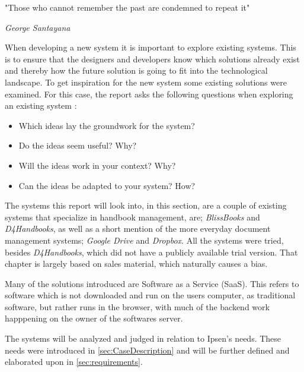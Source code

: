\epigraph{"Those who cannot remember the past are condemned to repeat it"}{\textit{George Santayana}}
When developing a new system it is important to explore existing systems.
This is to ensure that the designers and developers know which solutions already exist and thereby how the future solution is going to fit into the technological landscape.
To get inspiration for the new system some existing solutions were examined.
For this case, the report asks the following questions when exploring an existing system \citep[p.~33]{Rod-Aalborg}:

\begin{itemize}
  \item Which ideas lay the groundwork for the system?
  \item Do the ideas seem useful? Why?
  \item Will the ideas work in your context? Why?
  \item Can the ideas be adapted to your system? How?
\end{itemize}

The systems this report will look into, in this section, are a couple of existing systems that specialize in handbook management, are; \textit{BlissBooks} and \textit{D4Handbooks}, as well as a short mention of the more everyday document management systems; \textit{Google Drive} and \textit{Dropbox}.
All the systems were tried, besides \textit{D4Handbooks}, which did not have a publicly available trial version. That chapter is largely based on sales material, which naturally causes a bias.

Many of the solutions introduced are Software as a Service (SaaS).
This refers to software which is not downloaded and run on the users computer, as traditional software, but rather runs in the browser, with much of the backend work happpening on the owner of the softwares server. %

The systems will be analyzed and judged in relation to Ipsen's needs.
These needs were introduced in \ref{sec:CaseDescription} and will be further defined and elaborated upon in \ref{sec:requirements}.
